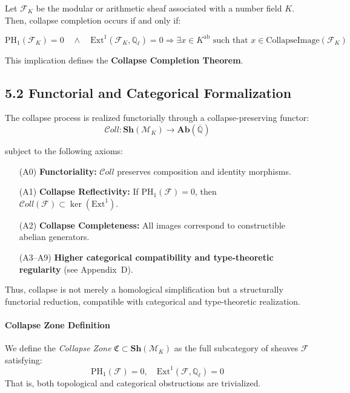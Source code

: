 \documentclass[11pt]{article}
\begin{document}
Let \( \mathcal{F}_K \) be the modular or arithmetic sheaf associated with a number field \( K \). Then, collapse completion occurs if and only if:

\[
\boxed{
\mathrm{PH}_1(\mathcal{F}_K) = 0 \quad \wedge \quad \mathrm{Ext}^1(\mathcal{F}_K, \mathbb{Q}_\ell) = 0
}
\Rightarrow \exists x \in K^{\mathrm{ab}} \text{ such that } x \in \text{CollapseImage}(\mathcal{F}_K)
\]

This implication defines the \textbf{Collapse Completion Theorem}.

\subsection{5.2 Functorial and Categorical Formalization}
\label{subsec:collapse-zone-formalization}

The collapse process is realized functorially through a collapse-preserving functor:
\[
\mathcal{C}oll : \mathbf{Sh}(\mathcal{M}_K) \to \mathbf{Ab}(\overline{\mathbb{Q}})
\]

subject to the following axioms:
\begin{itemize}
    \item[(A0)] \textbf{Functoriality:} \(\mathcal{C}oll\) preserves composition and identity morphisms.
    \item[(A1)] \textbf{Collapse Reflectivity:} If \( \mathrm{PH}_1(\mathcal{F}) = 0 \), then \( \mathcal{C}oll(\mathcal{F}) \subset \ker(\mathrm{Ext}^1) \).
    \item[(A2)] \textbf{Collapse Completeness:} All images correspond to constructible abelian generators.
    \item[(A3–A9)] \textbf{Higher categorical compatibility and type-theoretic regularity} (see Appendix~D).
\end{itemize}

Thus, collapse is not merely a homological simplification but a structurally functorial reduction, compatible with categorical and type-theoretic realization.

\medskip

\paragraph{Collapse Zone Definition}

We define the \emph{Collapse Zone} \( \mathfrak{C} \subset \mathbf{Sh}(\mathcal{M}_K) \) as the full subcategory of sheaves \( \mathcal{F} \) satisfying:
\[
\mathrm{PH}_1(\mathcal{F}) = 0,\quad \mathrm{Ext}^1(\mathcal{F}, \mathbb{Q}_\ell) = 0
\]
That is, both topological and categorical obstructions are trivialized.
\end{document}
